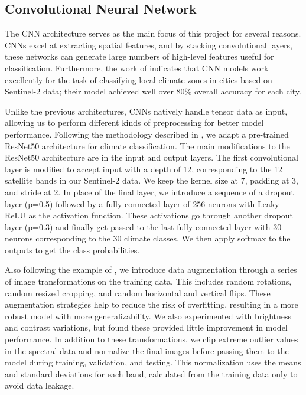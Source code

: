 \documentclass[12pt]{article}
\begin{document}
\subsection{Convolutional Neural Network}
\label{subsec:cnn-architecture}
The CNN architecture serves as the main focus of this project for several reasons.
CNNs excel at extracting spatial features, and by stacking convolutional layers, these networks can generate large numbers of high-level features useful for classification.
Furthermore, the work of \textcite{local-climate-zones-sentinel-2} indicates that CNN models work excellently for the task of classifying local climate zones in cities based on Sentinel-2 data; their model achieved well over 80\% overall accuracy for each city.

Unlike the previous architectures, CNNs natively handle tensor data as input, allowing us to perform different kinds of preprocessing for better model performance.
Following the methodology described in \textcite{resnet-sentinel-2}, we adapt a pre-trained ResNet50 architecture for climate classification.
The main modifications to the ResNet50 architecture are in the input and output layers.
The first convolutional layer is modified to accept input with a depth of 12, corresponding to the 12 satellite bands in our Sentinel-2 data.
We keep the kernel size at 7, padding at 3, and stride at 2.
In place of the final layer, we introduce a sequence of a dropout layer (p=0.5) followed by a fully-connected layer of 256 neurons with Leaky ReLU as the activation function.
These activations go through another dropout layer (p=0.3) and finally get passed to the last fully-connected layer with 30 neurons corresponding to the 30 climate classes.
We then apply softmax to the outputs to get the class probabilities.

Also following the example of \textcite{resnet-sentinel-2}, we introduce data augmentation through a series of image transformations on the training data.
This includes random rotations, random resized cropping, and random horizontal and vertical flips.
These augmentation strategies help to reduce the risk of overfitting, resulting in a more robust model with more generalizability.
We also experimented with brightness and contrast variations, but found these provided little improvement in model performance.
In addition to these transformations, we clip extreme outlier values in the spectral data and normalize the final images before passing them to the model during training, validation, and testing.
This normalization uses the means and standard deviations for each band, calculated from the training data only to avoid data leakage.
\end{document}
